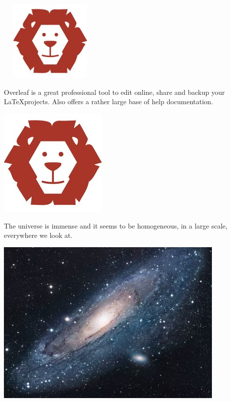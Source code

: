 \documentclass{article}
\begin{document}
\includegraphics[width=5cm, height=4cm]{lion-logo}

\vspace{1.5cm}

Overleaf is a great professional tool to edit online, 
share and backup your \LaTeX projects. Also offers a 
rather large base of help documentation.

\includegraphics[scale=1.2, angle=45]{lion-logo}

\newpage

The universe is immense and it seems to be homogeneous, in a large scale, everywhere we look at.

\includegraphics[width=\textwidth]{universe}
\end{document}
